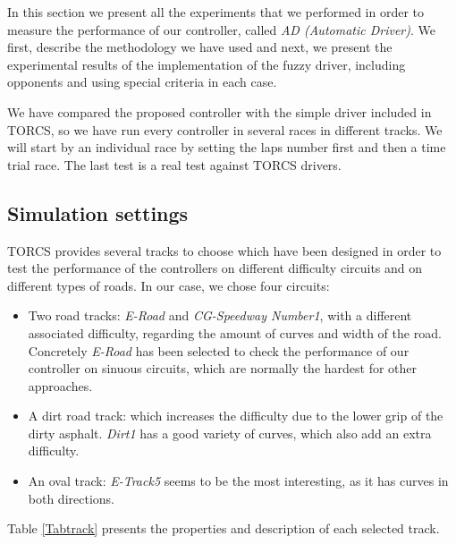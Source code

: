 \documentclass[runningheads,a4paper]{llncs}
\begin{document}
	In this section we present all the experiments that we performed in order to measure the performance of our controller, called \textit{AD (Automatic Driver)}.
	We first, describe the methodology we have used and next, we present the experimental results of the implementation of the fuzzy driver, including opponents and using special criteria in each case.
	
	We have compared the proposed controller with the simple driver included in TORCS, so we have run every controller in several races in different tracks.
	We will start by an individual race by setting the laps number first and then a time trial race. The last test is a real test against TORCS drivers.
	
	
	\subsection{Simulation settings}
	
	TORCS provides several tracks to choose which have been designed in order to test the performance of the controllers on different difficulty circuits and on different types of roads.
	In our case, we chose four circuits:
	
	\begin{itemize}
		\item Two road tracks: \textit{E-Road} and \textit{CG-Speedway Number1}, with a different associated difficulty, regarding the amount of curves and width of the road. Concretely \textit{E-Road} has been selected to check the performance of our controller on sinuous circuits, which are normally the hardest for other approaches. 
		\item A dirt road track: which increases the difficulty due to the lower grip of the dirty asphalt. \textit{Dirt1} has a good variety of curves, which also add an extra difficulty.
		\item An oval track: \textit{E-Track5} seems to be the most interesting, as it has curves in both directions.
	\end{itemize}
	
	Table \ref{Tabtrack} presents the properties and description of each selected track.
	
\end{document}
